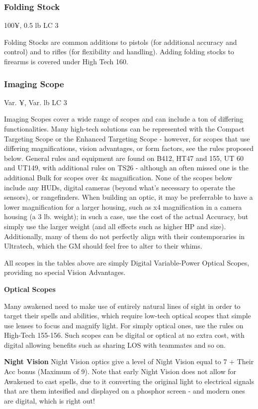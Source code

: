 \subsubsection{Folding Stock}
100¥, 0.5 lb LC 3

Folding Stocks are common additions to pistols (for additional accuracy and control) and to rifles (for flexibility and handling). Adding folding stocks to firearms is covered under High Tech 160.

\subsubsection{Imaging Scope}
Var. ¥, Var. lb LC 3

Imaging Scopes cover a wide range of scopes and can include a ton of differing functionalities. Many high-tech solutions can be represented with the Compact Targeting Scope or the Enhanced Targeting Scope - however, for scopes that use differing magnifications, vision advantages, or form factors, see the rules proposed below. General rules and equipment are found on B412, HT47 and 155, UT 60 and UT149, with additional rules on TS26 - although an often missed one is the additional Bulk for scopes over 4x magnification. None of the scopes below include any HUDs, digital cameras (beyond what's necessary to operate the sensors), or rangefinders. When building an optic, it may be preferrable to have a lower magnification for a larger housing, such as x4 magnification in a camera housing (a 3 lb. weight); in such a case, use the cost of the actual Accuracy, but simply use the larger weight (and all effects such as higher HP and size). Additionally, many of them do not perfectly align with their contemporaries in Ultratech, which the GM should feel free to alter to their whims.

All scopes in the tables above are simply Digital Variable-Power Optical Scopes, providing no special Vision Advantages.

\textbf{Optical Scopes}

Many awakened need to make use of entirely natural lines of sight in order to target their spells and abilities, which require low-tech optical scopes that simple use lenses to focus and magnify light. For simply optical ones, use the rules on High-Tech 155-156. Such scopes can be digital or optical at no extra cost, with digital allowing benefits such as sharing LOS with teammates and so on.

\textbf{Night Vision}
Night Vision optics give a level of Night Vision equal to 7 + Their Acc bonus (Maximum of 9).  Note that early Night Vision does not allow for Awakened to cast spells, due to it converting the original light to electrical signals that are them intesified and displayed on a phosphor screen - and modern ones are digital, which is right out!

